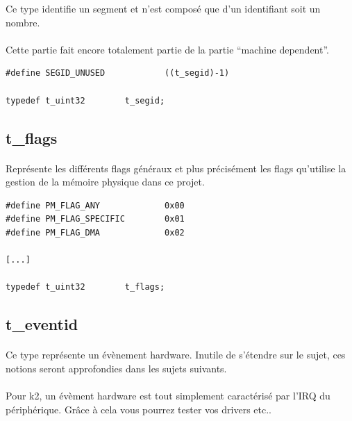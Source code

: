 \documentclass[10pt,a4wide]{article}
\begin{document}
Ce type identifie un segment et n'est compos\'e que d'un identifiant soit
un nombre.

\paragraph{}

Cette partie fait encore totalement partie de la partie ``machine dependent''.

\begin{verbatim}
#define SEGID_UNUSED            ((t_segid)-1)

typedef t_uint32        t_segid;
\end{verbatim}

\subsection{t\_flags}

\paragraph{}

Repr\'esente les diff\'erents flags g\'en\'eraux et plus pr\'ecis\'ement
les flags qu'utilise la gestion de la m\'emoire physique dans ce projet.

\begin{verbatim}
#define PM_FLAG_ANY             0x00
#define PM_FLAG_SPECIFIC        0x01
#define PM_FLAG_DMA             0x02

[...]

typedef t_uint32        t_flags;
\end{verbatim}

\subsection{t\_eventid}

\paragraph{}

Ce type repr\'esente un \'ev\`enement hardware. Inutile de s'\'etendre sur
le sujet, ces notions seront approfondies dans les sujets suivants.

\paragraph{}

Pour k2, un \'ev\`ement hardware est tout simplement caract\'eris\'e par
l'IRQ du p\'eriph\'erique. Gr\^ace \`a cela vous pourrez tester vos
drivers etc..
\end{document}
